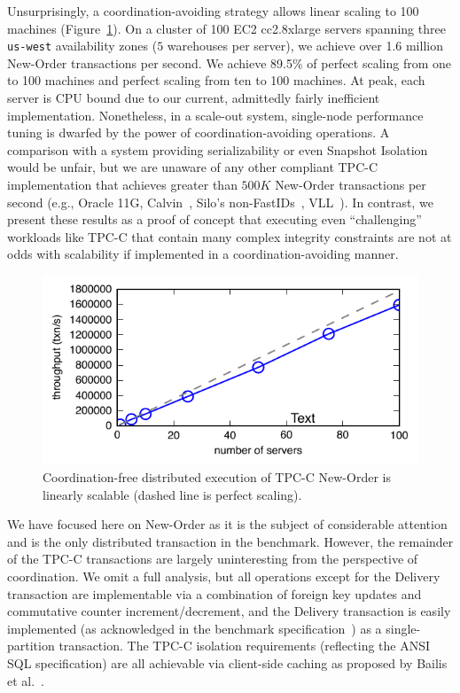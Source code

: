 Unsurprisingly, a coordination-avoiding strategy allows linear scaling
to 100 machines (Figure~\ref{fig:scaleout}). On a cluster of 100 EC2
cc2.8xlarge servers spanning three \texttt{us-west} availability zones
($5$ warehouses per server), we achieve over 1.6 million New-Order
transactions per second. We achieve 89.5\% of perfect scaling from one
to 100 machines and perfect scaling from ten to 100 machines. At peak,
each server is CPU bound due to our current, admittedly fairly
inefficient implementation. Nonetheless, in a scale-out system,
single-node performance tuning is dwarfed by the power of
coordination-avoiding operations. A comparison with a system providing
serializability or even Snapshot Isolation would be unfair, but we are
unaware of any other compliant TPC-C implementation that achieves
greater than $500K$ New-Order transactions per second (e.g., Oracle
11G, Calvin~\cite{calvin}, Silo's non-FastIDs~\cite{silo},
VLL~\cite{abadi-vll}). In contrast, we present these results as a
proof of concept that executing even ``challenging'' workloads like
TPC-C that contain many complex integrity constraints are not at odds
with scalability if implemented in a coordination-avoiding manner.

\begin{figure}
\begin{center}
\includegraphics[width=\columnwidth]{figs/thru_scale.pdf}\vspace{-2em}
\end{center}
\caption{Coordination-free distributed execution of TPC-C New-Order is
  linearly scalable (dashed line is perfect scaling).}
\label{fig:scaleout}
\end{figure}

 We have focused here on New-Order
as it is the subject of considerable attention and is the only
distributed transaction in the benchmark. However, the remainder of
the TPC-C transactions are largely uninteresting from the perspective
of coordination. We omit a full analysis, but all operations except
for the Delivery transaction are implementable via a combination of
foreign key updates and commutative counter increment/decrement, and
the Delivery transaction is easily implemented (as acknowledged in the
benchmark specification~\cite{abadi-vll}) as a single-partition
transaction. The TPC-C isolation requirements (reflecting the ANSI SQL
specification) are all achievable via client-side caching as proposed
by Bailis et al.~\cite{hat-vldb}.


